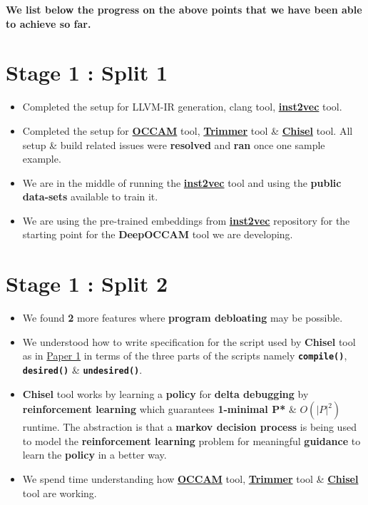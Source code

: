 \documentclass{article} %
\begin{document}
\textbf{\color{teal} We list below the progress on the above points that we have been able to achieve so far.}

\section*{Stage 1 : Split 1} 
\begin{itemize}
    \item Completed the setup for LLVM-IR generation, clang tool, \textbf{\href{https://github.com/lahiri-phdworks/ncc}{inst2vec}} tool. 
    \item Completed the setup for \textbf{\href{https://github.com/ashish-gehani/OCCAM}{OCCAM}} tool, \textbf{\href{http://www.csl.sri.com/users/gehani/papers/ASE-2018.Trimmer.pdf}{Trimmer}} tool \& \textbf{\href{https://github.com/aspire-project/chisel}{Chisel}} tool. All setup \& build related issues were \textbf{\color{teal}resolved} and \textbf{\color{teal}ran} once one sample example.
	\item We are in the middle of running the \textbf{\href{https://github.com/lahiri-phdworks/ncc}{inst2vec}} tool and using the \textbf{public data-sets} available to train it. 
	\item We are using the pre-trained embeddings from \textbf{\href{https://github.com/lahiri-phdworks/ncc}{inst2vec}} repository for the starting point for the \textbf{DeepOCCAM} tool we are developing.
\end{itemize}

\section*{Stage 1 : Split 2}
\begin{itemize}
	\item We found \textbf{2} more features where \textbf{program debloating} may be possible. 
	\item We understood how to write specification for the script used by \textbf{Chisel} tool as in \href{https://dl.acm.org/doi/10.1145/3243734.3243838}{Paper 1} in terms of the three parts of the scripts namely \textbf{\texttt{compile()}}, \textbf{\texttt{desired()}} \& \texttt{\textbf{undesired()}}.
	\item \textbf{Chisel} tool works by learning a \textbf{policy} for \textbf{delta debugging} by \textbf{reinforcement learning} which guarantees \textbf{1-minimal P*} \& $\textbf{$O(|P|^2)$}$ runtime. The abstraction is that a \textbf{markov decision process} is being used to model the \textbf{reinforcement learning} problem for meaningful \textbf{guidance} to learn the \textbf{policy} in a better way.
	\item We spend time understanding how \textbf{\href{https://github.com/ashish-gehani/OCCAM}{OCCAM}} tool, \textbf{\href{http://www.csl.sri.com/users/gehani/papers/ASE-2018.Trimmer.pdf}{Trimmer}} tool \& \textbf{\href{https://github.com/aspire-project/chisel}{Chisel}} tool are working.
\end{itemize}
\end{document}
